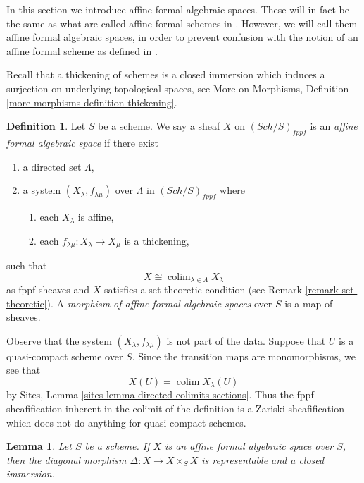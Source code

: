\documentclass{stacks-project}
\theoremstyle{plain}
\newtheorem{lemma}[subsection]{Lemma}
\theoremstyle{definition}
\newtheorem{definition}[subsection]{Definition}
\theoremstyle{remark}
\numberwithin{equation}{subsection}
\def\colim{\mathop{\mathrm{colim}}\nolimits}
\def\Sch{\mathit{Sch}}
\begin{document}
\noindent
In this section we introduce affine formal algebraic spaces.
These will in fact be the same as what are called affine
formal schemes in \cite{BVGD}. However, we will call
them affine formal algebraic spaces, in order to prevent confusion with
the notion of an affine formal scheme as defined in \cite{EGA}.

\medskip\noindent
Recall that a thickening of schemes is a closed
immersion which induces a surjection on underlying topological
spaces, see More on Morphisms, Definition
\ref{more-morphisms-definition-thickening}.

\begin{definition}
\label{definition-affine-formal-algebraic-space}
Let $S$ be a scheme. We say a sheaf $X$ on $(\Sch/S)_{fppf}$ is an
{\it affine formal algebraic space} if there exist
\begin{enumerate}
\item a directed set $\Lambda$,
\item a system $(X_\lambda, f_{\lambda \mu})$ over $\Lambda$
in $(\Sch/S)_{fppf}$ where
\begin{enumerate}
\item each $X_\lambda$ is affine,
\item each $f_{\lambda \mu} : X_\lambda \to X_\mu$ is a thickening,
\end{enumerate}
\end{enumerate}
such that
$$
X \cong \colim_{\lambda \in \Lambda} X_\lambda
$$
as fppf sheaves and $X$ satisfies a set theoretic condition
(see Remark \ref{remark-set-theoretic}). A
{\it morphism of affine formal algebraic spaces}
over $S$ is a map of sheaves.
\end{definition}

\noindent
Observe that the system $(X_\lambda, f_{\lambda \mu})$ is not
part of the data. Suppose that $U$ is a quasi-compact scheme over $S$.
Since the transition maps are monomorphisms, we see that
$$
X(U) = \colim X_\lambda(U)
$$
by Sites, Lemma \ref{sites-lemma-directed-colimits-sections}.
Thus the fppf sheafification inherent in the colimit of the
definition is a Zariski sheafification which does not do
anything for quasi-compact schemes.

\begin{lemma}
\label{lemma-diagonal-affine-formal-algebraic-space}
Let $S$ be a scheme. If $X$ is an affine formal algebraic space over
$S$, then the diagonal morphism $\Delta : X \to X \times_S X$
is representable and a closed immersion.
\end{lemma}
\end{document}

